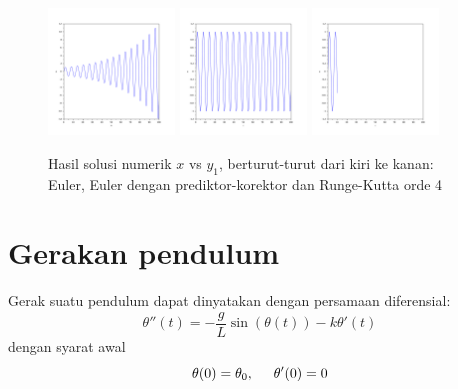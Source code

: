 \documentclass[10pt,bahasa]{article}
\begin{document}
\begin{figure}[H]
{\centering
\includegraphics[width=0.3\textwidth]{images/soal_01_ode_euler_t_y1.pdf}
\includegraphics[width=0.3\textwidth]{images/soal_01_ode_euler_PC_t_y1.pdf}
\includegraphics[width=0.3\textwidth]{images/soal_01_ode_RK4_t_y1.pdf}
\par}
\caption{Hasil solusi numerik $x$ vs $y_1$, berturut-turut dari kiri ke kanan:
Euler, Euler dengan prediktor-korektor dan Runge-Kutta orde 4}
\end{figure}

\section{Gerakan pendulum}

Gerak suatu pendulum dapat dinyatakan dengan persamaan diferensial:
\begin{equation}
\theta''(t) = -\frac{g}{L}\sin(\theta(t)) - k\theta'(t)
\end{equation}
dengan syarat awal
\begin{equation}
\theta(0) = \theta_0, \hspace{0.5cm} \theta'(0) = 0
\end{equation}
\end{document}
